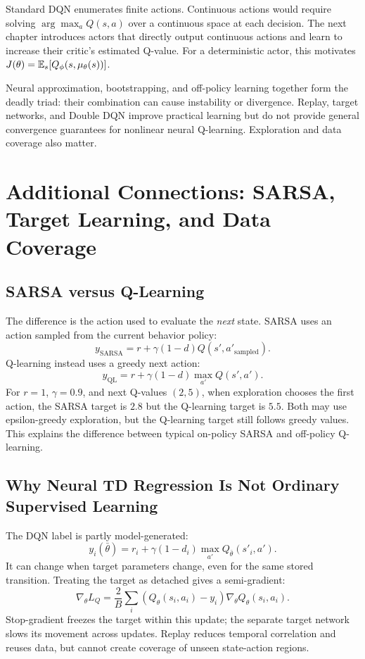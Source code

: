 Standard DQN enumerates finite actions. Continuous actions would require
solving $\arg\max_a Q(s,a)$ over a continuous space at each decision.
The next chapter introduces actors that directly output continuous
actions and learn to increase their critic's estimated Q-value.
For a deterministic actor, this motivates
$J(\theta)=\mathbb{E}_s[Q_\phi(s,\mu_\theta(s))]$.

Neural approximation, bootstrapping, and off-policy learning together
form the deadly triad: their combination can cause instability or
divergence. Replay, target networks, and Double DQN improve practical
learning but do not provide general convergence guarantees for
nonlinear neural Q-learning. Exploration and data coverage also matter.

\section{Additional Connections: SARSA, Target Learning, and Data Coverage}
\subsection{SARSA versus Q-Learning}
The difference is the action used to evaluate the \emph{next} state. SARSA uses an action sampled from the current behavior policy:
\begin{equation}
y_{\mathrm{SARSA}}=r+\gamma(1-d)Q(s',a'_{\mathrm{sampled}}).
\end{equation}
Q-learning instead uses a greedy next action:
\begin{equation}
y_{\mathrm{QL}}=r+\gamma(1-d)\max_{a'}Q(s',a').
\end{equation}
For $r=1$, $\gamma=0.9$, and next Q-values $(2,5)$, when exploration chooses the first action, the SARSA target is $2.8$ but the Q-learning target is $5.5$. Both may use epsilon-greedy exploration, but the Q-learning target still follows greedy values. This explains the difference between typical on-policy SARSA and off-policy Q-learning.

\subsection{Why Neural TD Regression Is Not Ordinary Supervised Learning}
The DQN label is partly model-generated:
\begin{equation}
y_i(\bar\theta)=r_i+\gamma(1-d_i)\max_{a'}Q_{\bar\theta}(s'_i,a').
\end{equation}
It can change when target parameters change, even for the same stored transition. Treating the target as detached gives a semi-gradient:
\begin{equation}
\nabla_\theta L_Q=\frac{2}{B}\sum_i
(Q_\theta(s_i,a_i)-y_i)\nabla_\theta Q_\theta(s_i,a_i).
\end{equation}
Stop-gradient freezes the target within this update; the separate target network slows its movement across updates. Replay reduces temporal correlation and reuses data, but cannot create coverage of unseen state-action regions.

